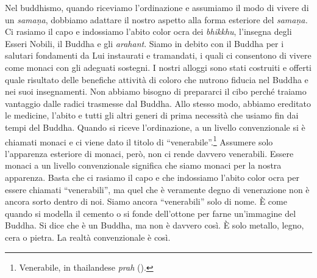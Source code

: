 Nel buddhismo, quando riceviamo l'ordinazione e assumiamo il modo di
vivere di un \emph{samaṇa}, dobbiamo adattare il nostro aspetto alla
forma esteriore del \emph{samaṇa.} Ci rasiamo il capo e indossiamo
l'abito color ocra dei \emph{bhikkhu}, l'insegna degli Esseri Nobili, il
Buddha e gli \emph{arahant}. Siamo in debito con il Buddha per i
salutari fondamenti da Lui instaurati e tramandati, i quali ci
consentono di vivere come monaci con gli adeguati sostegni. I nostri
alloggi sono stati costruiti e offerti quale risultato delle benefiche
attività di coloro che nutrono fiducia nel Buddha e nei suoi
insegnamenti. Non abbiamo bisogno di prepararci il cibo perché traiamo
vantaggio dalle radici trasmesse dal Buddha. Allo stesso modo, abbiamo
ereditato le medicine, l'abito e tutti gli altri generi di prima
necessità che usiamo fin dai tempi del Buddha. Quando si riceve
l'ordinazione, a un livello convenzionale si è chiamati monaci e ci
viene dato il titolo di ``venerabile''.\footnote{Venerabile, in
  thailandese \emph{prah} ().} Assumere solo l'apparenza esteriore di
monaci, però, non ci rende davvero venerabili. Essere monaci a un
livello convenzionale significa che siamo monaci per la nostra
apparenza. Basta che ci rasiamo il capo e che indossiamo l'abito color
ocra per essere chiamati ``venerabili'', ma quel che è veramente degno
di venerazione non è ancora sorto dentro di noi. Siamo ancora
``venerabili'' solo di nome. È come quando si modella il cemento o si
fonde dell'ottone per farne un'immagine del Buddha. Si dice che è un
Buddha, ma non è davvero così. È solo metallo, legno, cera o pietra. La
realtà convenzionale è così.

